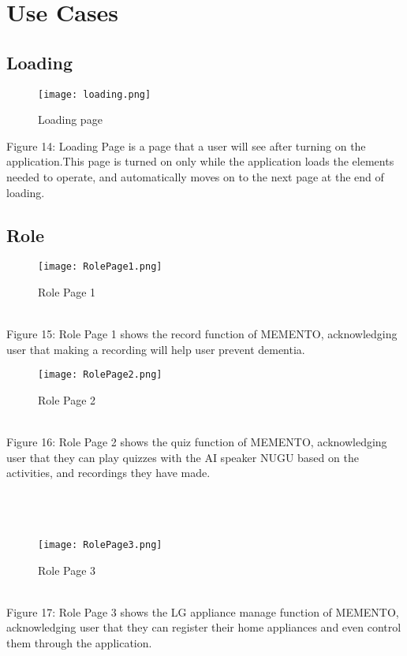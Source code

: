 \documentclass[conference]{IEEEtran}
\begin{document}
\section{Use Cases}
\subsection{Loading}
\begin{figure}[h]
\centerline{\texttt{[image: loading.png]}}
\caption{Loading page}
\label{fig}
\end{figure}
Figure 14: Loading Page is a page that a user will see after turning on the application.This page is turned on only while the application loads the elements needed to operate, and automatically moves on to the next page at the end of loading.\\

\clearpage
\subsection{Role}
\begin{figure}[h]
\centerline{\texttt{[image: RolePage1.png]}}
\caption{Role Page 1}
\label{fig}
\end{figure}
\\
Figure 15: Role Page 1 shows the record function of MEMENTO, acknowledging user that making a recording will help user prevent dementia.

\begin{figure}[h]
\centerline{\texttt{[image: RolePage2.png]}}
\caption{Role Page 2}
\label{fig}
\end{figure}
\\
Figure 16: Role Page 2 shows the quiz function of MEMENTO, acknowledging user that they can play quizzes with the AI speaker NUGU based on the activities, and recordings they have made.
\\\\\\\\
\begin{figure}[h]
\centerline{\texttt{[image: RolePage3.png]}}
\caption{Role Page 3}
\label{fig}
\end{figure}
\\
\indent Figure 17: Role Page 3 shows the LG appliance manage function of MEMENTO, acknowledging user that they can register their home appliances and even control them through the application.
\end{document}
